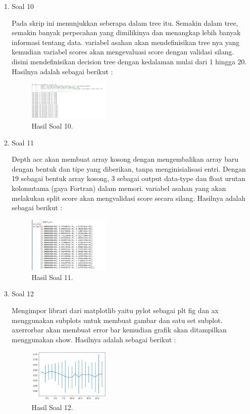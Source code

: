 \begin{enumerate}
	\item Soal 10
	\hfill\break
	
	Pada skrip ini menunjukkan seberapa dalam tree itu. Semakin dalam tree, semakin banyak perpecahan yang dimilikinya dan menangkap lebih banyak informasi tentang data. variabel asahan akan mendefinisikan tree nya yang kemudian variabel scores akan mengevaluasi score dengan validasi silang. disini mendefinisikan decision tree dengan kedalaman mulai dari 1 hingga 20. Hasilnya adalah sebagai berikut :
	\begin{figure}[H]
	\centering
		\includegraphics[width=4cm]{figures/1174021/tugas2/materi/hasil10.PNG}
		\caption{Hasil Soal 10.}
	\end{figure}

	\item Soal 11
	\hfill\break
	
	Depth acc akan membuat array kosong dengan mengembalikan array baru dengan bentuk dan tipe yang diberikan, tanpa menginisialisasi entri. Dengan 19 sebagai bentuk array kosong, 3 sebagai output data-type dan float urutan kolomutama (gaya Fortran) dalam memori. variabel asahan yang akan melakukan split score akan mengvalidasi score secara silang. Hasilnya adalah sebagai berikut :
	\begin{figure}[H]
	\centering
		\includegraphics[width=4cm]{figures/1174021/tugas2/materi/hasil11.PNG}
		\caption{Hasil Soal 11.}
	\end{figure}

	\item Soal 12
	\hfill\break
	
	Mengimpor librari dari matplotlib yaitu pylot sebagai plt fig dan ax menggunakan subplots untuk membuat gambar dan satu set subplot. axerrorbar akan membuat error bar kemudian grafik akan ditampilkan menggunakan show. Hasilnya adalah sebagai berikut :
	\begin{figure}[H]
	\centering
		\includegraphics[width=4cm]{figures/1174021/tugas2/materi/hasil12.PNG}
		\caption{Hasil Soal 12.}
	\end{figure}
\end{enumerate}

